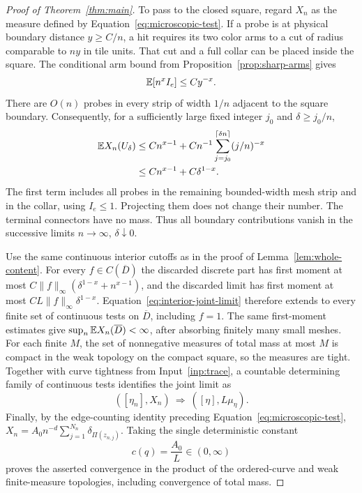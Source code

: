 \begin{proof}[Proof of Theorem~\ref{thm:main}]
To pass to the closed square, regard $X_n$ as the measure defined by
Equation~\eqref{eq:microscopic-test}.  If a probe is at physical
boundary distance $y\ge C/n$, a hit requires its two color arms to a
cut of radius comparable to $ny$ in tile units.  That cut and a full
collar can be placed inside the square.  The conditional arm bound
from Proposition~\ref{prop:sharp-arms} gives
\begin{equation}
 \mathbb E[n^x I_e]\le Cy^{-x}.
 \label{eq:lattice-near-boundary-first-moment}
\end{equation}
There are $O(n)$ probes in every strip of width $1/n$ adjacent to the
square boundary.  Consequently, for a sufficiently large fixed
integer $j_0$ and $\delta\ge j_0/n$,
\begin{align}
 \mathbb E X_n(U_\delta)
 &\le Cn^{x-1}
       +Cn^{-1}\sum_{j=j_0}^{\lceil\delta n\rceil}(j/n)^{-x}
 \nonumber\\
 &\le Cn^{x-1}+C\delta^{1-x}.
 \label{eq:lattice-boundary-strip}
\end{align}
The first term includes all probes in the remaining bounded-width
mesh strip and in the collar, using $I_e\le1$.  Projecting them does
not change their number.  The terminal connectors have no mass.
Thus all boundary contributions vanish in the successive limits
$n\to\infty$, $\delta\downarrow0$.

Use the same continuous interior cutoffs as in the proof of
Lemma~\ref{lem:whole-content}.  For every $f\in C(\overline D)$ the
discarded discrete part has first moment at most
$C\|f\|_\infty(\delta^{1-x}+n^{x-1})$, and the discarded limit has
first moment at most $CL\|f\|_\infty\delta^{1-x}$.
Equation~\eqref{eq:interior-joint-limit} therefore extends to every
finite set of continuous tests on $\overline D$, including $f=1$.
The same first-moment estimates give
$\sup_n\mathbb E X_n(\overline D)<\infty$, after absorbing finitely many
small meshes.  For each finite $M$, the set of nonnegative measures of
total mass at most $M$ is compact in the weak topology on the compact square,
so the measures are tight.  Together with curve tightness from
Input~\ref{inp:trace}, a countable determining family of continuous
tests identifies the joint limit as
\[
 ([\eta_n],X_n)\ \Longrightarrow\ ([\eta],L\mu_\eta).
\]
Finally, by the edge-counting identity preceding
Equation~\eqref{eq:microscopic-test},
$X_n=A_0n^{-d}\sum_{j=1}^{N_n}\delta_{\Pi(z_{n,j})}$.
Taking the single deterministic constant
\[
 c(q)=\frac{A_0}{L}\in(0,\infty)
\]
proves the asserted convergence in the product of the ordered-curve
and weak finite-measure topologies, including convergence of total
mass.
\end{proof}
